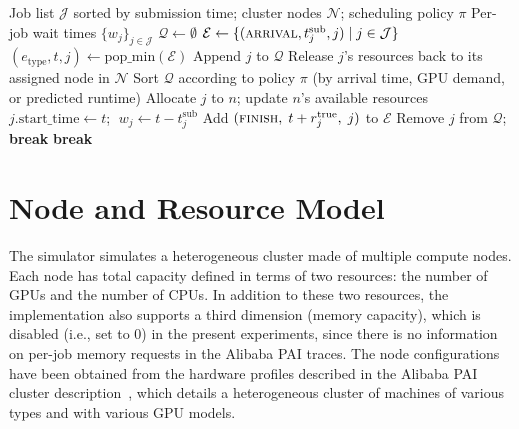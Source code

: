 \begin{algorithm}[htbp]
\caption{Discrete event simulation main loop.}
\label{alg:des}
\begin{algorithmic}[1]
\Require Job list $\mathcal{J}$ sorted by submission time; cluster nodes $\mathcal{N}$; scheduling policy $\pi$
\Ensure Per-job wait times $\{w_j\}_{j \in \mathcal{J}}$
\State $\mathcal{Q} \leftarrow \emptyset$ 
\State $\mathcal{E} \leftarrow \{(\textsc{arrival}, t_j^{\text{sub}}, j) \mid j \in \mathcal{J}\}$ 
    \State $(e_{\text{type}}, t, j) \leftarrow \text{pop\_min}(\mathcal{E})$ 
        \State Append $j$ to $\mathcal{Q}$
        \State Release $j$'s resources back to its assigned node in $\mathcal{N}$
    \EndIf
    \State {} 
\EndWhile
{}
    \State Sort $\mathcal{Q}$ according to policy $\pi$ (by arrival time, GPU demand, or predicted runtime)
                \State Allocate $j$ to $n$; update $n$'s available resources
                \State $j.\text{start\_time} \leftarrow t$; $\;w_j \leftarrow t - t_j^{\text{sub}}$
                \State Add $(\textsc{finish},\; t + r_j^{\text{true}},\; j)$ to $\mathcal{E}$
                \State Remove $j$ from $\mathcal{Q}$; \textbf{break}
            \EndIf
        \EndFor
         \textbf{break} 
        \EndIf
    \EndFor
\EndProcedure
\end{algorithmic}
\end{algorithm}

\section{Node and Resource Model}
\label{sec:nodemodel}

The simulator simulates a heterogeneous cluster made of multiple compute nodes. Each node has total capacity defined in terms of two resources: the number of GPUs and the number of CPUs. In addition to these two resources, the implementation also supports a third dimension (memory capacity), which is disabled (i.e., set to 0) in the present experiments, since there is no information on per-job memory requests in the Alibaba PAI traces. The node configurations have been obtained from the hardware profiles described in the Alibaba PAI cluster description~\cite{weng2022mlaas}, which details a heterogeneous cluster of machines of various types and with various GPU models.

